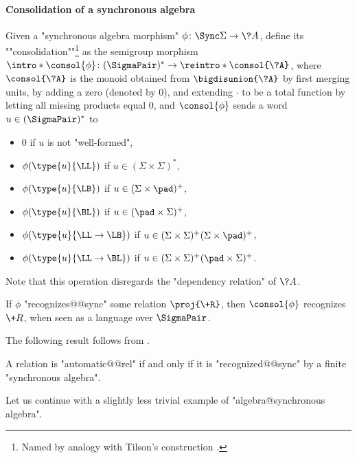 \paragraph*{Consolidation of a synchronous algebra}
Given a "synchronous algebra morphism" $\phi\colon \Sync\Sigma \to \?A$,
define its \AP""consolidation""\footnote{Named by analogy with Tilson's construction \cite[\S~3, p.~102]{Tilson1987Categories}.} as the semigroup morphism
$\intro*\consol{\phi}\colon (\SigmaPair)^* \to \reintro*\consol{\?A}$, where
$\consol{\?A}$ is the monoid obtained from
$\bigdisunion{\?A}$ by first merging units,
by adding a zero (denoted by $0$), and extending $\cdot$
to be a total function by letting all missing products equal $0$,
and $\consol{\phi}$ sends a word $u \in (\SigmaPair)^*$ to%
\begin{itemize}%
	\item $0$ if $u$ is not "well-formed",
	\item $\phi(\type{u}{\LL})$ if $u \in (\Sigma\times \Sigma)^*$,
	\item $\phi(\type{u}{\LB})$ if $u \in (\Sigma\times \pad)^+$,
	\item $\phi(\type{u}{\BL})$ if $u \in (\pad\times \Sigma)^+$,
	\item $\phi(\type{u}{\LL\to\LB})$ if $u \in (\Sigma\times \Sigma)^+(\Sigma\times \pad)^+$,
	\item $\phi(\type{u}{\LL\to\BL})$ if $u \in (\Sigma\times \Sigma)^+(\pad\times \Sigma)^+$.
\end{itemize}
Note that this operation disregards the "dependency relation" of $\?A$.
\begin{fact}
	\AP\label{fact:consolidation}
	If $\phi$ "recognizes@@sync" some relation $\proj{\+R}$,
	then $\consol{\phi}$ recognizes $\+R$, when seen as
	a language over $\SigmaPair$.
\end{fact}

The following result follows from .
\begin{proposition}
	\AP\label{prop:synchronous-iff-finite}
	A relation is "automatic@@rel" if and only if it is "recognized@@sync"
	by a finite "synchronous algebra".
\end{proposition}

Let us continue with a slightly less trivial example of "algebra@synchronous algebra".

